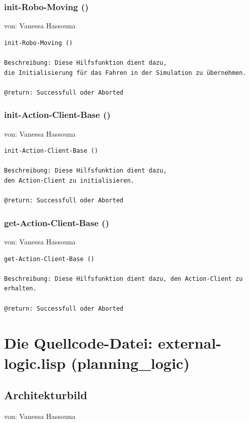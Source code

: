 \documentclass{suturo}
\makeatletter
\newcommand{\chapterauthor}[1]{%
  {\parindent0pt\vspace*{-27pt}%
  \linespread{0}\small\begin{flushright}von: #1\end{flushright}%
  \par\nobreak\vspace*{0pt}}
  \@afterheading%
}
\makeatother
\begin{document}
\subsubsection{init-Robo-Moving ()}
\chapterauthor{Vanessa Hassouna}
\begin{verbatim}
init-Robo-Moving ()

Beschreibung: Diese Hilfsfunktion dient dazu,
die Initialisierung für das Fahren in der Simulation zu übernehmen.

@return: Successfull oder Aborted
\end{verbatim}

\subsubsection{init-Action-Client-Base ()}
\chapterauthor{Vanessa Hassouna}
\begin{verbatim}
init-Action-Client-Base ()

Beschreibung: Diese Hilfsfunktion dient dazu, 
den Action-Client zu initialisieren.

@return: Successfull oder Aborted
\end{verbatim}

\subsubsection{get-Action-Client-Base ()}
\chapterauthor{Vanessa Hassouna}
\begin{verbatim}
get-Action-Client-Base ()

Beschreibung: Diese Hilfsfunktion dient dazu, den Action-Client zu erhalten.

@return: Successfull oder Aborted
\end{verbatim}






\section{Die Quellcode-Datei: external-logic.lisp (planning\_logic)}
\subsection{Architekturbild}
\chapterauthor{Vanessa Hassouna}


\begin{figure}[!htb]
\end{figure}
\end{document}
